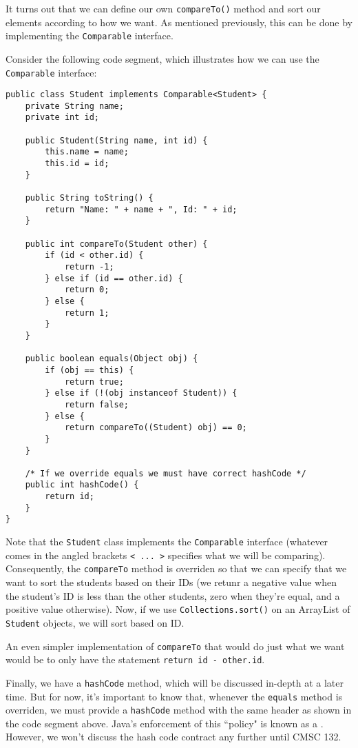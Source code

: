 It turns out that we can define our own \verb!compareTo()! method and sort our elements according to how we want. As mentioned previously, this can be done by implementing the \verb!Comparable! interface. 


Consider the following  code segment, which illustrates how we can use the \verb!Comparable! interface:



\begin{lstlisting}
public class Student implements Comparable<Student> {
	private String name;
	private int id;

	public Student(String name, int id) {
		this.name = name;
		this.id = id;
	}

	public String toString() {
		return "Name: " + name + ", Id: " + id;
	}

	public int compareTo(Student other) {
		if (id < other.id) {
			return -1;
		} else if (id == other.id) {
			return 0;
		} else {
			return 1;
		}
	}

	public boolean equals(Object obj) {
		if (obj == this) {
			return true;
		} else if (!(obj instanceof Student)) {
			return false;
		} else {
			return compareTo((Student) obj) == 0;
		}
	}

	/* If we override equals we must have correct hashCode */
	public int hashCode() {
		return id;
	}
}
\end{lstlisting}

Note that the \verb!Student! class implements the \verb!Comparable! interface (whatever comes in the angled brackets \verb!< ... >! specifies what we will be comparing). Consequently, the  \verb!compareTo! method is overriden so that we can specify that we want to sort the students based on their IDs (we retunr a negative value when the student's ID is less than the other students, zero when they're equal, and a positive value otherwise). Now, if we use \verb!Collections.sort()! on an ArrayList of \verb!Student! objects, we will sort based on ID. 

An even simpler implementation of \verb!compareTo! that would do just what we want would be to only have the statement \verb!return id - other.id!.

Finally, we have a \verb!hashCode! method, which will be discussed in-depth at a later time. But for now, it's important to know that, whenever the \verb!equals! method is overriden, we must provide a \verb!hashCode! method with the same header as shown in the code segment above. Java's enforcement of this ``policy" is known as a . However, we won't discuss the hash code contract any further until CMSC 132.

